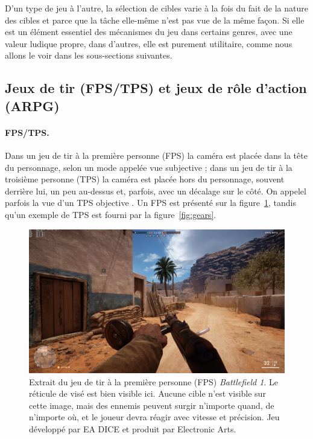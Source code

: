 	D'un type de jeu à l'autre, la sélection de cibles varie à la fois du fait de la nature des cibles et parce que la tâche elle-même n'est pas vue de la même façon. Si elle est un élément essentiel des mécanismes du jeu dans certains genres, avec une valeur ludique propre, dans d'autres, elle est purement utilitaire, comme nous allons le voir dans les sous-sections suivantes.
	
	\subsection{Jeux de tir (FPS/TPS) et jeux de rôle d'action (ARPG)}
	\paragraph{FPS/TPS.}
	Dans un jeu de tir à la première personne (FPS) la caméra est placée \og dans la tête \fg{} du personnage, selon un mode appelée \og vue subjective \fg{} ; dans un jeu de tir à la troisième personne (TPS) la caméra est placée hors du personnage, souvent derrière lui, un peu au-dessus et, parfois, avec un décalage sur le côté. On appelel parfois la vue d'un TPS \og objective \fg{}. Un FPS est présenté sur la figure~\ref{fig:bf1}, tandis qu'un exemple de TPS est fourni par la figure~\ref{fig:gears}.
	
	\begin{figure}[H]
		\centering
		\includegraphics[width=\textwidth]{figures/ch1/bf1}
		\caption[Le FPS \emph{Battlefield 1}.]{Extrait du jeu de tir à la première personne (FPS) \emph{Battlefield 1}. Le réticule de visé est bien visible ici. Aucune cible n'est visible sur cette image, mais des ennemis peuvent surgir n'importe quand, de n'importe où, et le joueur devra réagir avec vitesse et précision. Jeu développé par EA DICE et produit par Electronic Arts.}
		\label{fig:bf1}
	\end{figure}
	
